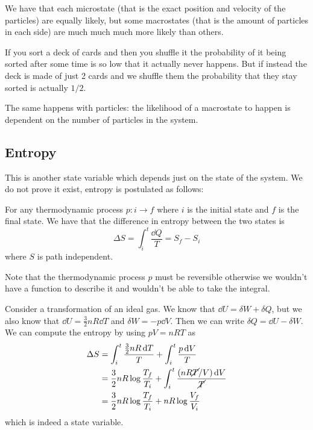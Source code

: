 \documentclass[14pt]{extarticle}
\begin{document}
We have that each microstate (that is the exact position and velocity of the particles) are equally likely, but some macrostates (that is the amount of particles in each side) are much much much more likely than others.

If you sort a deck of cards and then you shuffle it the probability of it being sorted after some time is so low that it actually never happens.
But if instead the deck is made of just 2 cards and we shuffle them the probability that they stay sorted is actually $1/2$.

The same happens with particles:
the likelihood of a macrostate to happen is dependent on the number of particles in the system.

\subsection{Entropy}

This is another state variable which depends just on the state of the system.
We do not prove it exist, entropy is postulated as follows:

\begin{definition}[entropy]
    For any thermodynamic process $p: i \to f$ where $i$ is the initial state and $f$ is the final state. We have that the difference in entropy between the two states is
    \begin{equation}
        \Delta S = \int_i^t \frac{\dd{Q}}{T} = S_f - S_i
    \end{equation}
    where $S$ is path independent.

    Note that the thermodynamic process $p$ must be reversible otherwise we wouldn't have a function to describe it and wouldn't be able to take the integral.
\end{definition}

\begin{example}
    Consider a transformation of an ideal gas.
    We know that $\dd{U} = \delta W + \delta Q$, but we also know that $\dd{U} = \frac{3}{2} n R \dd{T}$ and $\delta W = -p \dd{V}$.
    Then we can write $\delta Q = \dd{U} - \delta W$.
    We can compute the entropy by using $pV = nRT$ as
    \begin{align}
        \Delta S & = \int_i^t \frac{\frac{3}{2} n R \dd{T}}{T} + \int_i^t \frac{p \dd{V}}{T}                   \\
                 & = \frac{3}{2} nR \log \frac{T_f}{T_i} + \int_i^t \frac{(nR\cancel{T}/V) \dd{V}}{\cancel{T}} \\
                 & = \frac{3}{2} nR \log \frac{T_f}{T_i} + nR \log \frac{V_f}{V_i}
    \end{align}
    which is indeed a state variable.
\end{example}
\end{document}
